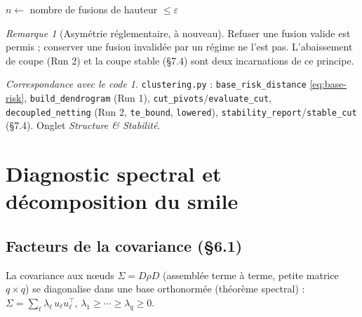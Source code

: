 \documentclass[11pt,a4paper]{article}
\newcommand{\code}[1]{\texttt{#1}}
\theoremstyle{plain}
\theoremstyle{definition}
\theoremstyle{remark}
\newtheorem{remarque}[theoreme]{Remarque}
\newtheorem*{impl}{Correspondance avec le code}
\begin{document}
\begin{algorithm}[H]
\caption{Coupe stable --- survie sous toutes les covariances}
$n \leftarrow$ nombre de fusions de hauteur $\le \varepsilon$\;
\;
\end{algorithm}

\begin{remarque}[Asymétrie réglementaire, à nouveau]
Refuser une fusion valide est permis ; conserver une fusion invalidée par un régime ne
l'est pas. L'abaissement de coupe (Run 2) et la coupe stable (\S7.4) sont deux
incarnations de ce principe.
\end{remarque}

\begin{impl}
\code{clustering.py} : \code{base\_risk\_distance} \eqref{eq:base-risk},
\code{build\_dendrogram} (Run 1), \code{cut\_pivots}/\code{evaluate\_cut},
\code{decoupled\_netting} (Run 2, \code{te\_bound}, \code{lowered}),
\code{stability\_report}/\code{stable\_cut} (\S7.4). Onglet
\emph{Structure \& Stabilité}.
\end{impl}

\section{Diagnostic spectral et décomposition du smile}\label{sec:spectral}

\subsection{Facteurs de la covariance (\S6.1)}
La covariance aux nœuds $\Sigma = D\rho D$ (assemblée terme à terme, petite matrice
$q\times q$) se diagonalise dans une base orthonormée (théorème spectral) :
$\Sigma = \sum_\ell \lambda_\ell\, u_\ell u_\ell^\top$, $\lambda_1\ge\cdots\ge\lambda_q\ge0$.
\end{document}
